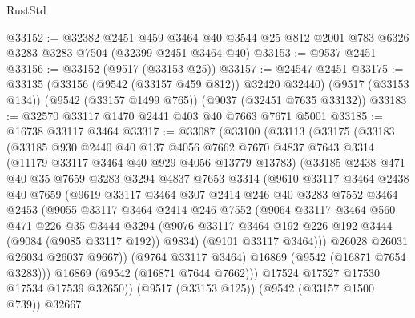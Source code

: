 \begin{lexlean}{RustStd}
\begin{coremodule}
@33152 := @32382
    @2451
    @459
    @3464
    @40
    @3544
    @25
    @812
    @2001
    @783
    @6326
    @3283
    @3283
    @7504
    (@32399 @2451 @3464 @40)
@33153 := @9537 @2451
@33156 := @33152 (@9517 (@33153 @25))
@33157 := @24547 @2451
@33175 := @33135
    (@33156 (@9542 (@33157 @459 @812)) @32420 @32440)
    (@9517 (@33153 @134))
    (@9542 (@33157 @1499 @765))
    (@9037 (@32451 @7635 @33132))
@33183 := @32570 @33117 @1470 @2441 @403 @40 @7663 @7671 @5001
@33185 := @16738 @33117 @3464
@33317 := @33087
    (@33100
      (@33113
        (@33175
          (@33183
            (@33185
              @930
              @2440
              @40
              @137
              @4056
              @7662
              @7670
              @4837
              @7643
              @3314
              (@11179 @33117 @3464 @40 @929 @4056 @13779 @13783)
              (@33185
                @2438
                @471
                @40
                @35
                @7659
                @3283
                @3294
                @4837
                @7653
                @3314
                (@9610
                  @33117
                  @3464
                  @2438
                  @40
                  @7659
                  (@9619
                    @33117
                    @3464
                    @307
                    @2414
                    @246
                    @40
                    @3283
                    @7552
                    @3464
                    @2453
                    (@9055
                      @33117
                      @3464
                      @2414
                      @246
                      @7552
                      (@9064
                        @33117
                        @3464
                        @560
                        @471
                        @226
                        @35
                        @3444
                        @3294
                        (@9076 @33117 @3464 @192 @226 @192 @3444 (@9084 (@9085 @33117 @192)) @9834)
                        (@9101 @33117 @3464)))
                    @26028
                    @26031
                    @26034
                    @26037
                    @9667))
                (@9764 @33117 @3464)
                @16869
                (@9542 (@16871 @7654 @3283)))
              @16869
              (@9542 (@16871 @7644 @7662)))
            @17524
            @17527
            @17530
            @17534
            @17539
            @32650))
        (@9517 (@33153 @125))
        (@9542 (@33157 @1500 @739))
        @32667

\end{coremodule}
\end{lexlean}
